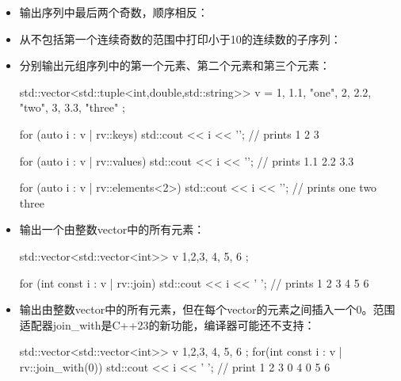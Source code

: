 \begin{itemize}
  \item
        输出序列中最后两个奇数，顺序相反：


  \item
        从不包括第一个连续奇数的范围中打印小于10的连续数的子序列：


  \item
        分别输出元组序列中的第一个元素、第二个元素和第三个元素：

        \begin{cpp}
std::vector<std::tuple<int,double,std::string>> v =
{
	{1, 1.1, "one"},
	{2, 2.2, "two"},
	{3, 3.3, "three"}
};

for (auto i : v | rv::keys)
	std::cout << i << '\n'; // prints 1 2 3
	
for (auto i : v | rv::values)
	std::cout << i << '\n'; // prints 1.1 2.2 3.3
	
for (auto i : v | rv::elements<2>)
	std::cout << i << '\n'; // prints one two three
\end{cpp}

  \item
        输出一个由整数vector中的所有元素：

        \begin{cpp}
std::vector<std::vector<int>> v {
	{1,2,3}, {4}, {5, 6}
};

for (int const i : v | rv::join)
	std::cout << i << ' '; // prints 1 2 3 4 5 6
\end{cpp}

  \item
        输出由整数vector中的所有元素，但在每个vector的元素之间插入一个0。范围适配器join\_with是C++23的新功能，编译器可能还不支持：

        \begin{cpp}
std::vector<std::vector<int>> v{
	{1,2,3}, {4}, {5, 6}
};
for(int const i : v | rv::join_with(0))
	std::cout << i << ' '; // print 1 2 3 0 4 0 5 6
\end{cpp}


\end{itemize}
